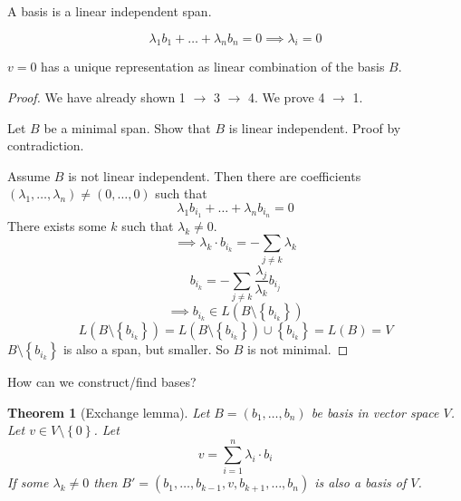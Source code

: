 \documentclass[a4paper,landscape,twocolumn]{article}
\newcommand\set[1]{\left\{#1\right\}}
\newtheorem{theorem}{Theorem}[section]
\begin{document}
A basis is a linear independent span.

\[ \lambda_1 b_1 + \dots + \lambda_n b_n = 0 \implies \lambda_i = 0 \]

$v=0$ has a unique representation as linear combination of the basis $B$.


\begin{proof}
  We have already shown 1 $\rightarrow$ 3 $\rightarrow$ 4. We prove 4 $\rightarrow$ 1.

  Let $B$ be a minimal span. Show that $B$ is linear independent.
  Proof by contradiction.

  Assume $B$ is not linear independent.
  Then there are coefficients $(\lambda_1, \dots, \lambda_n) \neq (0, \dots, 0)$
  such that
  \[ \lambda_1 b_{i_1} + \dots + \lambda_n b_{i_n} = 0 \]
  There exists some $k$ such that $\lambda_k \neq 0$.
  \[ \implies \lambda_k \cdot b_{i_k} = -\sum_{j\neq k} \lambda_k \]
  \[ b_{i_k} = -\sum_{j\neq k} \frac{\lambda_j}{\lambda_k} b_{i_j} \]
  \[ \implies b_{i_k} \in L(B \setminus \set{b_{i_k}}) \]
  \[
    L(B \setminus \set{b_{i_k}})
    = L(B \setminus \set{b_{i_k}}) \cup \set{b_{i_k}}
    = L(B) = V
  \]
  $B \setminus \set{b_{i_k}}$ is also a span, but smaller.
  So $B$ is not minimal.
\end{proof}

How can we construct/find bases?

\begin{theorem}[Exchange lemma]
  \label{lemma-3-26}
  Let $B = (b_1, \ldots, b_n)$ be basis in vector space $V$.
  Let $v \in V \setminus \set{0}$.
  Let
  \[ v = \sum_{i=1}^n \lambda_i \cdot b_i \]
  If some $\lambda_k \neq 0$ then $B' = (b_1, \dots, b_{k-1}, v, b_{k+1}, \dots, b_n)$ is also a basis of $V$.
\end{theorem}
\end{document}

